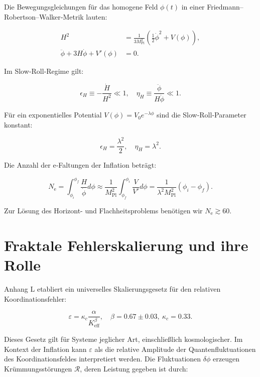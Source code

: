 \documentclass[11pt,a4paper]{article}
\newcommand{\eps}{\varepsilon}
\newcommand{\kappac}{\kappa_c}
\newcommand{\Keff}{K_{\mathrm{eff}}}
\newcommand{\Mpl}{M_{\mathrm{Pl}}}
\newcommand{\ninf}{N_{\mathrm{e}}}
\begin{document}
	Die Bewegungsgleichungen für das homogene Feld \(\phi(t)\) in einer Friedmann–Robertson–Walker‑Metrik lauten:
	
	\begin{align}
		H^2 &= \frac{1}{3\Mpl^2} \left( \frac{1}{2}\dot{\phi}^2 + V(\phi) \right), \label{eq:friedman1} \\
		\ddot{\phi} + 3H\dot{\phi} + V'(\phi) &= 0. \label{eq:field}
	\end{align}
	
	Im Slow‑Roll‑Regime gilt:
	
	\begin{equation}
		\epsilon_H \equiv -\frac{\dot{H}}{H^2} \ll 1, \quad \eta_H \equiv \frac{\ddot{\phi}}{H\dot{\phi}} \ll 1.
	\end{equation}
	
	Für ein exponentielles Potential \(V(\phi) = V_0 e^{-\lambda \phi}\) sind die Slow‑Roll‑Parameter konstant:
	
	\begin{equation}
		\epsilon_H = \frac{\lambda^2}{2}, \quad \eta_H = \lambda^2.
		\label{eq:slowroll}
	\end{equation}
	
	Die Anzahl der e‑Faltungen der Inflation beträgt:
	
	\begin{equation}
		\ninf = \int_{\phi_i}^{\phi_f} \frac{H}{\dot{\phi}} d\phi \approx \frac{1}{\Mpl^2} \int_{\phi_f}^{\phi_i} \frac{V}{V'} d\phi = \frac{1}{\lambda^2 \Mpl^2} (\phi_i - \phi_f).
	\end{equation}
	
	Zur Lösung des Horizont- und Flachheitsproblems benötigen wir \(\ninf \gtrsim 60\).
	
	\section{Fraktale Fehlerskalierung und ihre Rolle}
	\label{sec:fractal}
	
	Anhang L etabliert ein universelles Skalierungsgesetz für den relativen Koordinationsfehler:
	
	\begin{equation}
		\eps = \kappac \frac{\alpha}{\Keff^{\beta}}, \quad \beta = 0.67 \pm 0.03,\ \kappac = 0.33.
		\label{eq:error-scaling}
	\end{equation}
	
	Dieses Gesetz gilt für Systeme jeglicher Art, einschließlich kosmologischer. Im Kontext der Inflation kann \(\eps\) als die relative Amplitude der Quantenfluktuationen des Koordinationsfeldes interpretiert werden. Die Fluktuationen \(\delta \phi\) erzeugen Krümmungsstörungen \(\mathcal{R}\), deren Leistung gegeben ist durch:
	
\end{document}
